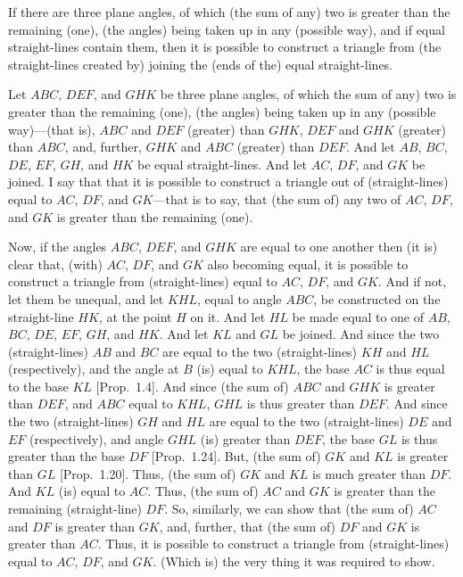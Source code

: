 \begin{Parallel}{}{}
{If there are three plane angles, of which (the sum of any)
two is greater than the remaining (one), (the angles) being taken up in
any (possible way), and if equal straight-lines contain them, then it is
possible to construct a triangle from (the straight-lines created by) joining the
(ends of the) equal straight-lines.

\epsfysize=0.9in
\centerline{}

Let $ABC$, $DEF$, and $GHK$ be three plane angles, of which the sum of any)
two is greater than the remaining (one), (the angles) being taken up in
any (possible way)---(that is), $ABC$ and $DEF$ (greater) than $GHK$,
$DEF$ and $GHK$ (greater) than $ABC$, and, further, $GHK$
and $ABC$ (greater) than $DEF$. And let $AB$, $BC$, $DE$, $EF$,
$GH$, and $HK$ be equal straight-lines. And let $AC$, $DF$, and
$GK$ be joined. I say that that it is possible to construct a
triangle out of (straight-lines) equal to $AC$, $DF$, and $GK$---that is to say, that (the sum of) any two of $AC$, $DF$, and $GK$ is greater than
the remaining (one).

Now, if the angles $ABC$, $DEF$, and $GHK$ are equal to one another then
(it is)  clear that, (with) $AC$, $DF$, and $GK$ also becoming equal, it is
possible to construct a triangle from (straight-lines) equal to
$AC$, $DF$, and $GK$. And if not, let them be unequal, and let $KHL$,
equal to angle $ABC$, be constructed on the straight-line
$HK$, at the point $H$ on it. And let $HL$ be made equal to one
of $AB$, $BC$, $DE$, $EF$, $GH$, and $HK$. And let $KL$
and $GL$ be joined. And since the two (straight-lines) $AB$ and
$BC$ are equal to the two (straight-lines) $KH$ and $HL$ (respectively), 
and the angle at $B$ (is) equal to $KHL$, the base $AC$ is thus equal to the
base $KL$ [Prop.~1.4]. And since (the sum of)
$ABC$ and $GHK$ is greater than $DEF$, and $ABC$
equal to $KHL$,  $GHL$ is thus greater than $DEF$. And since the
two (straight-lines) $GH$ and $HL$ are equal to the two (straight-lines)
$DE$ and $EF$ (respectively), and angle $GHL$ (is) greater than $DEF$, the base $GL$ is thus greater than the base $DF$ [Prop.~1.24]. 
But, (the sum of) $GK$ and $KL$ is greater than $GL$ [Prop.~1.20]. Thus, (the sum of) $GK$ and $KL$
is much greater than $DF$.  And $KL$ (is) equal to $AC$. Thus, (the sum of)
$AC$ and $GK$ is greater than the remaining (straight-line) $DF$.
So, similarly, we can show that (the sum of) $AC$ and $DF$
is greater than $GK$, and, further, that (the sum of) $DF$ and $GK$
is greater than $AC$. Thus, it is possible to construct a triangle from
(straight-lines) equal to $AC$, $DF$, and $GK$. (Which is) the very
thing it was required to show.}
\end{Parallel}

